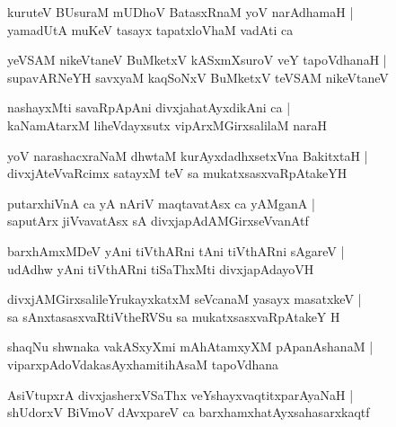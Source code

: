 \begin{shloka}
kuruteV BUsuraM mUDhoV BatasxRnaM yoV narAdhamaH |\\
yamadUtA muKeV tasayx tapatxloVhaM vadAti ca
\end{shloka}

\begin{shloka}
yeVSAM nikeVtaneV BuMketxV kASxmXsuroV veY tapoVdhanaH |\\
supavARNeYH savxyaM kaqSoNxV BuMketxV teVSAM nikeVtaneV
\end{shloka}

\begin{shloka}
nashayxMti savaRpApAni divxjahatAyxdikAni ca |\\
kaNamAtarxM liheVdayxsutx vipArxMGirxsalilaM naraH
\end{shloka}

\begin{shloka}
yoV narashacxraNaM dhwtaM kurAyxdadhxsetxVna BakitxtaH |\\
divxjAteVvaRcimx satayxM teV sa mukatxsasxvaRpAtakeYH
\end{shloka}

\begin{shloka}
putarxhiVnA ca yA nAriV maqtavatAsx ca yAMganA |\\
saputArx jiVvavatAsx sA divxjapAdAMGirxseVvanAtf
\end{shloka}

\begin{shloka}
barxhAmxMDeV yAni tiVthARni tAni tiVthARni sAgareV |\\
udAdhw yAni tiVthARni tiSaThxMti divxjapAdayoVH
\end{shloka}

\begin{shloka}
divxjAMGirxsalileYrukayxkatxM seVcanaM yasayx masatxkeV |\\
sa sAnxtasasxvaRtiVtheRVSu sa mukatxsasxvaRpAtakeY H
\end{shloka}

\begin{shloka}
shaqNu shwnaka vakASxyXmi mAhAtamxyXM pApanAshanaM |\\
viparxpAdoVdakasAyxhamitihAsaM tapoVdhana
\end{shloka}

\begin{shloka}
AsiVtupxrA divxjasherxVSaThx veYshayxvaqtitxparAyaNaH |\\
shUdorxV BiVmoV dAvxpareV ca barxhamxhatAyxsahasarxkaqtf 
\end{shloka}

